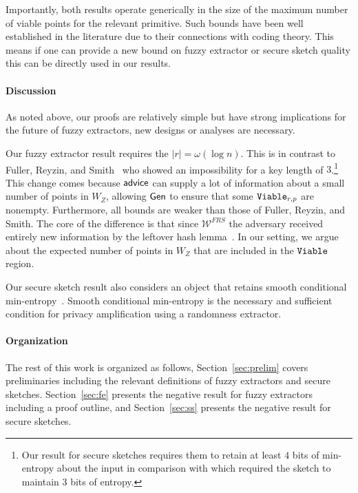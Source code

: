 Importantly, both results operate generically in the size of the maximum number of viable points for the relevant primitive.  Such bounds have been well established in the literature due to their connections with coding theory.  This means if one can provide a new bound on fuzzy extractor or secure sketch quality this can be directly used in our results. 


\paragraph{Discussion}
As noted above, our proofs are relatively simple but have strong implications for the future of fuzzy extractors, new designs or analyses are necessary.

Our fuzzy extractor result requires the $|r| = \omega(\log n)$.  This is in contrast to Fuller, Reyzin, and Smith~\cite{fuller2020computational} who showed an impossibility for a key length of $3$.\footnote{Our result for secure sketches requires them to retain at least $4$ bits of min-entropy about the input in comparison with \cite{fuller2020computational} which required the sketch to maintain $3$ bits of entropy.} This change comes because ${\mathsf{advice}}$ can supply a lot of information about a small number of points in $W_Z$, allowing ${\mathsf{Gen}}$ to ensure that some $\mathtt{Viable}_{r,p}$ are nonempty. Furthermore, all bounds are weaker than those of Fuller, Reyzin, and Smith.  The core of the difference is that since $\mathcal{W}^{FRS}$ the adversary received entirely new information by the leftover hash lemma~\cite{haastad1993construction,barak2011leftover}. In our setting, we argue about the expected number of points in $W_Z$ that are included in the $\mathtt{Viable}$ region. 

Our secure sketch result also considers an object that retains smooth conditional min-entropy~\cite{renner2005simple}.  %
Smooth conditional min-entropy is the necessary and sufficient condition for privacy amplification using a randomness extractor. 


\paragraph{Organization} The rest of this work is organized as follows, Section~\ref{sec:prelim} covers preliminaries including the relevant definitions of fuzzy extractors and secure sketches.  Section~\ref{sec:fe} presents the negative result for fuzzy extractors including a proof outline, and Section~\ref{sec:ss} presents the negative result for secure sketches.


